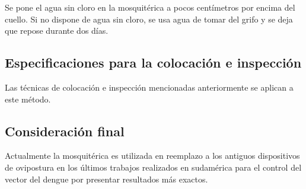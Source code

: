 Se pone el agua sin cloro en la mosquitérica a pocos centímetros por encima
del cuello. Si no dispone de agua sin cloro, se usa agua de tomar del grifo
y se deja que repose durante dos días.

\subsection{Especificaciones para la colocación e inspección}
Las técnicas de colocación e inspección mencionadas anteriormente se aplican
a este método.

\subsection{Consideración final}
Actualmente la mosquitérica es utilizada en reemplazo a los antiguos
dispositivos de ovipostura en los últimos trabajos realizados en sudamérica
para el control del vector del dengue por presentar resultados más exactos.
